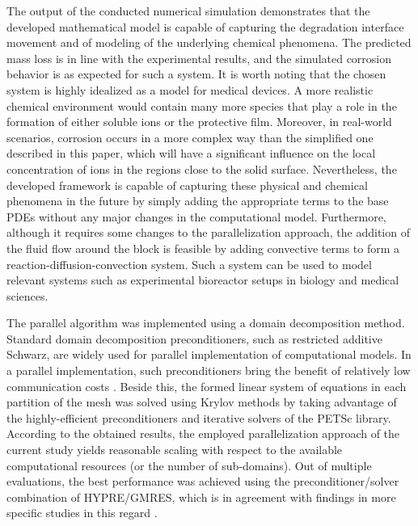 The output of the conducted numerical simulation demonstrates that the developed mathematical model is capable of capturing the degradation interface movement and of modeling of the underlying chemical phenomena. The predicted mass loss is in line with the experimental results, and the simulated corrosion behavior is as expected for such a system. It is worth noting that the chosen system is highly idealized as a model for medical devices. A more realistic chemical environment would contain many more species that play a role in the formation of either soluble ions or the protective film. Moreover, in real-world scenarios, corrosion occurs in a more complex way than the simplified one described in this paper, which will have a significant influence on the local concentration of ions in the regions close to the solid surface. Nevertheless, the developed framework is capable of capturing these physical and chemical phenomena in the future by simply adding the appropriate terms to the base {PDE}s without any major changes in the computational model. Furthermore, although it requires some changes to the parallelization approach, the addition of the fluid flow around the block is feasible by adding convective terms to form a reaction-diffusion-convection system. Such a system can be used to model relevant systems such as experimental bioreactor setups in biology and medical sciences.

The parallel algorithm was implemented using a domain decomposition method. Standard domain decomposition preconditioners, such as restricted additive Schwarz, are widely used for parallel implementation of computational models. In a parallel implementation, such preconditioners bring the benefit of relatively low communication costs \cite{Daas2019AMS}. Beside this, the formed linear system of equations in each partition of the mesh was solved using Krylov methods by taking advantage of the highly-efficient preconditioners and iterative solvers of the {PETSc} library. According to the obtained results, the employed parallelization approach of the current study yields reasonable scaling with respect to the available computational resources (or the number of sub-domains). Out of multiple evaluations, the best performance was achieved using the preconditioner/solver combination of HYPRE/{GMRES}, which is in agreement with findings in more specific studies in this regard \cite{Ghai2018}.


